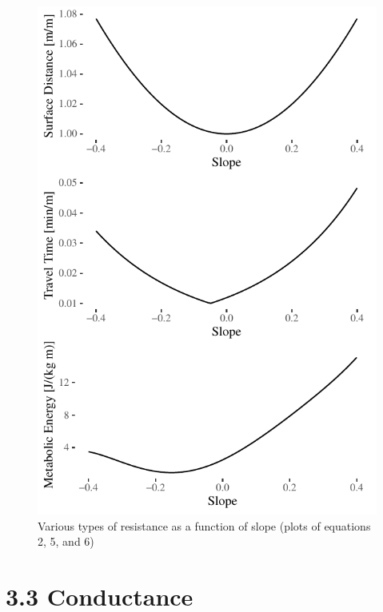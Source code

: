 \documentclass[]{elsarticle} %
\makeatletter
\def\maxwidth{\ifdim\Gin@nat@width>\linewidth\linewidth
\else\Gin@nat@width\fi}
\let\Oldincludegraphics\includegraphics
\renewcommand{\includegraphics}[1]{\Oldincludegraphics[width=\maxwidth]{#1}}
\makeatother
\begin{document}
\begin{figure}
\centering
\includegraphics{Cost-Functions-for-Walking-Accessibility_files/figure-latex/figure-resistance-functions-1.pdf}
\caption{\label{fig:figure-resistance-functions}Various types of
resistance as a function of slope (plots of equations 2, 5, and 6)}
\end{figure}

\hypertarget{conductance}{%
\section{3.3 Conductance}\label{conductance}}
\end{document}
